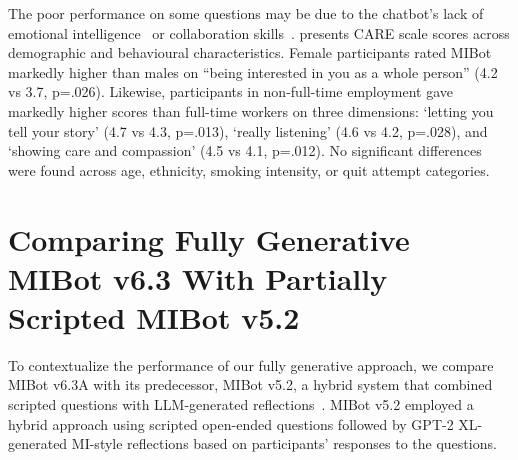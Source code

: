 The poor performance on some questions may be due to the chatbot's lack of emotional intelligence~\citep{sabour-etal-2024-emobench} or collaboration skills~\citep{yang-etal-2024-human}.  presents CARE scale scores across demographic and behavioural characteristics. Female participants rated MIBot markedly higher than males on ``being interested in you as a whole person'' (4.2 vs 3.7, p=.026). Likewise, participants in non-full-time employment gave markedly higher scores than full-time workers on three dimensions: `letting you tell your story' (4.7 vs 4.3, p=.013), `really listening' (4.6 vs 4.2, p=.028), and `showing care and compassion' (4.5 vs 4.1, p=.012). No significant differences were found across age, ethnicity, smoking intensity, or quit attempt categories.







\section{Comparing Fully Generative MIBot v6.3 With Partially Scripted MIBot v5.2}
\label{sec:comparison-v52}

To contextualize the performance of our fully generative approach, we compare MIBot v6.3A with its predecessor, MIBot v5.2, a hybrid system that combined scripted questions with LLM-generated reflections~\citep{brown2023mi}. MIBot v5.2 employed a hybrid approach using scripted open-ended questions followed by GPT-2 XL-generated MI-style reflections based on participants' responses to the questions.

